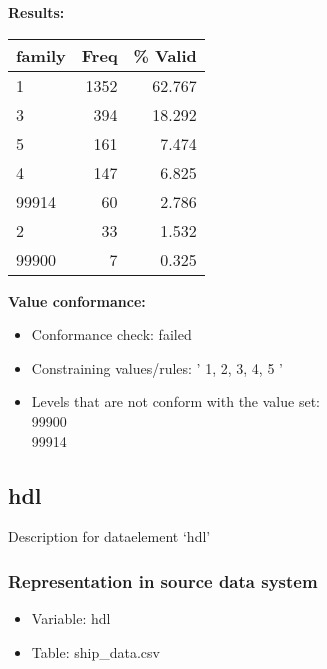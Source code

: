 \documentclass[
]{article}
\providecommand{\tightlist}{%
  \setlength{\itemsep}{0pt}\setlength{\parskip}{0pt}}
\begin{document}
\textbf{Results:}\\

\begin{table}[H]
\centering
\begin{tabular}{l|r|r}
\hline
\textbf{family} & \textbf{Freq} & \textbf{\% Valid}\\
\hline
1 & 1352 & 62.767\\
\hline
3 & 394 & 18.292\\
\hline
5 & 161 & 7.474\\
\hline
4 & 147 & 6.825\\
\hline
99914 & 60 & 2.786\\
\hline
2 & 33 & 1.532\\
\hline
99900 & 7 & 0.325\\
\hline
\end{tabular}
\end{table}

\textbf{Value conformance:}

\begin{itemize}
\tightlist
\item
  Conformance check: failed
\item
  Constraining values/rules: ' 1, 2, 3, 4, 5 '
\item
  Levels that are not conform with the value set:\\
  99900\\
  99914
\end{itemize}

\newpage

\hypertarget{hdl}{%
\subsection{hdl}\label{hdl}}

Description for dataelement `hdl'

\hypertarget{representation-in-source-data-system-12}{%
\subsubsection{\texorpdfstring{Representation in \textbf{source} data
system}{Representation in source data system}}\label{representation-in-source-data-system-12}}

\begin{itemize}
\tightlist
\item
  Variable: hdl
\item
  Table: ship\_data.csv
\end{itemize}
\end{document}
